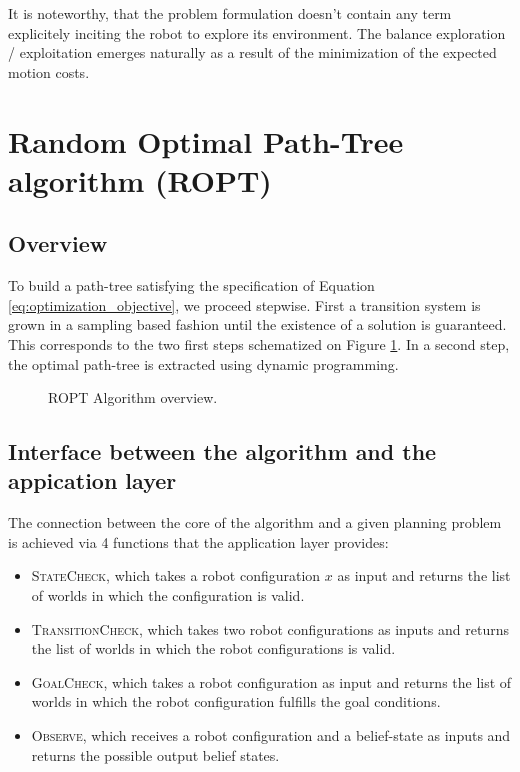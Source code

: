 \documentclass[letterpaper, 10 pt, conference]{ieeeconf}  %
\begin{document}
It is noteworthy, that the problem formulation doesn't contain any term explicitely inciting the robot to explore its environment. The balance exploration / exploitation emerges naturally as a result of the minimization of the expected motion costs.
\section{Random Optimal Path-Tree algorithm (ROPT)}

\subsection{Overview}

To build a path-tree satisfying the specification of Equation \ref{eq:optimization_objective}, we proceed stepwise. First a transition system is grown in a sampling based fashion until the existence of a solution is guaranteed. This corresponds to the two first steps schematized on Figure \ref{algorithm_overview}. In a second step, the optimal path-tree is extracted using dynamic programming. 

\begin{figure}[!htb]
\scriptsize
{}
 \caption{ROPT Algorithm overview.}
 \label{algorithm_overview}
\end{figure}

\subsection{Interface between the algorithm and the appication layer}

The connection between the core of the algorithm and a given planning problem is achieved via 4 functions that the application layer provides: 
\begin{itemize}
\item \textsc{StateCheck}, which takes a robot configuration $x$ as input and returns the list of worlds in which the configuration is valid.
\item \textsc{TransitionCheck}, which takes two robot configurations as inputs and returns the list of worlds in which the robot configurations is valid.
\item \textsc{GoalCheck}, which takes a robot configuration as input and returns the list of worlds in which the robot configuration fulfills the goal conditions.
\item \textsc{Observe}, which receives a robot configuration and a belief-state as inputs and returns the possible output belief states. %
\end{itemize}
\end{document}
